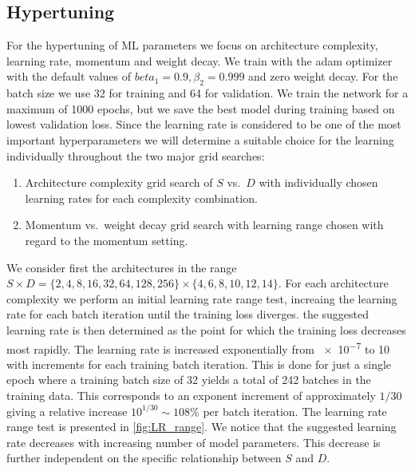 \subsection{Hypertuning}
For the hypertuning of \acrshort{ML} parameters we focus on architecture complexity, learning rate, momentum and weight decay. We train with the adam optimizer with the default values of $beta_1 = 0.9, \beta_2 = 0.999$ and zero weight decay. For the batch size we use 32 for training and 64 for validation. We train the network for a maximum of 1000 epochs, but we save the best model during training based on lowest validation loss. Since the learning rate is considered to be one of the most important hyperparameters we will determine a suitable choice for the learning individually throughout the two major grid searches:
\begin{enumerate}
  \item Architecture complexity grid search of $S$ vs.\ $D$ with individually chosen learning rates for each complexity combination.
  \item Momentum vs.\ weight decay grid search with learning range chosen with regard to the momentum setting. 
\end{enumerate}
We consider first the architectures in the range $S \times D =
\{2,4,8,16,32,64,128,256\} \times \{4,6,8,10,12,14\}$. For each architecture
complexity we perform an initial learning rate range test, increaing the
learning rate for each batch iteration until the training loss diverges. the suggested learning rate is then determined as the point for which the training loss decreases most rapidly. The learning rate is increased exponentially from \num{e-7} to 10 with increments for each training batch iteration. This is done for just a single epoch where a training batch size of 32 yields a total of 242 batches in the training data. This corresponds to an exponent increment of approximately $1/30$ giving a relative increase $10^{1/30} \sim 108\%$ per batch iteration. The learning rate range test is presented in \cref{fig:LR_range}. We notice that the suggested learning rate decreases with increasing number of model parameters. This decrease is further independent on the specific relationship between $S$ and $D$. %

